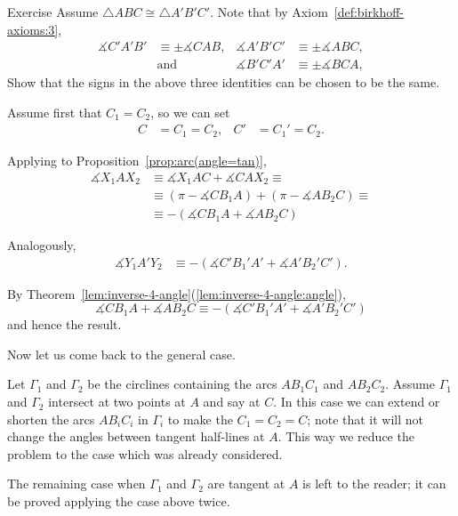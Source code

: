 {\begin{thm}{Exercise}\label{ex:angle-signs-in-trig}
Assume $\triangle ABC\cong\triangle A'B'C'$. 
Note that by Axiom~\ref{def:birkhoff-axioms:3},
\begin{align*}
\measuredangle C'A'B'&\equiv\pm\measuredangle CAB,
&
\measuredangle A'B'C'&\equiv\pm\measuredangle ABC,
\\
&\text{and}&\measuredangle B'C'A'&\equiv\pm\measuredangle BCA,
\end{align*}
Show that the signs in the above three identities can be chosen
to be the same. 
\end{thm}









Assume first that $C_1=C_2$, so we can set 
\begin{align*}
C&=C_1=C_2,
&
C'&=C_1'=C_2.
\end{align*}


Applying to Proposition~\ref{prop:arc(angle=tan)},
\begin{align*}
\measuredangle X_1AX_2&\equiv\measuredangle X_1AC+\measuredangle CAX_2\equiv
\\
&\equiv(\pi-\measuredangle CB_1A)+(\pi-\measuredangle AB_2 C)\equiv
\\
&
\equiv -(\measuredangle CB_1A+\measuredangle AB_2 C)
\end{align*}

Analogously,
\begin{align*}
\measuredangle Y_1A'Y_2&
\equiv -(\measuredangle C'B_1'A'+\measuredangle A'B_2' C').
\end{align*}

By Theorem~\ref{lem:inverse-4-angle}(\ref{lem:inverse-4-angle:angle}), 
\[\measuredangle CB_1A+\measuredangle AB_2 C
\equiv
-(\measuredangle C'B_1'A'+\measuredangle A'B_2' C')
\]
and hence the result.

Now let us come back to the general case.

Let $\Gamma_1$ and $\Gamma_2$ be the circlines containing the arcs $AB_1C_1$ and $AB_2C_2$.
Assume $\Gamma_1$ and $\Gamma_2$ intersect at two points at $A$ and say at $C$.
In this case we can extend or shorten the arcs  $AB_iC_i$ in $\Gamma_i$ to make the $C_1=C_2=C$;
note that it will not change the angles between tangent half-lines at $A$.
This way we reduce the problem to the case which was already considered.

The remaining case when $\Gamma_1$ and $\Gamma_2$ are tangent at $A$ is left to the reader;
it can be proved applying the case above twice.
\qeds













}
